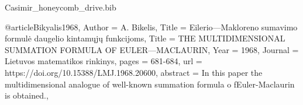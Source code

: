 \documentclass[twoside, 10pt, ptm]{article}
\def\myfilename{Casimir_honeycomb_drive}
\begin{document}
\begin{multicols}{2}
\begin{filecontents}{\myfilename.bib}

@article{Bikyalis1968,
    Author = {A. Bikelis},
    Title = {Eilerio—Makloreno sumavimo formulė daugelio kintamųjų funkcijoms},
    Title = {THE MULTIDIMENSIONAL SUMMATION FORMULA OF EULER—MACLAURIN},
    Year = {1968},
    Journal = {Lietuvos matematikos rinkinys},
    pages = {681-684},
    url = {https://doi.org/10.15388/LMJ.1968.20600},
    abstract = {In this paper the multidimensional analogue of well-known summation formula o fEuler-Maclaurin is obtained.},
}



\end{filecontents}
\end{multicols}
\end{document}
